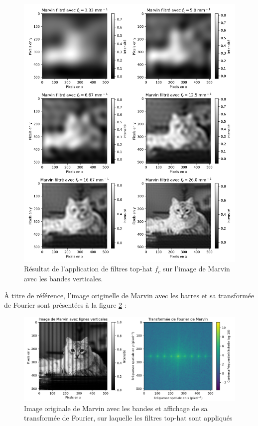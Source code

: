 \documentclass[11pt,letterpaper]{article}
\begin{document}
\begin{figure}[H]
  \centering
  \includegraphics[scale=0.7]{marvin_post_filter_bars.png}
  \caption{Résultat de l'application de filtres top-hat $f_c$ sur l'image de Marvin avec les bandes verticales.}
  \label{cats}
\end{figure}

À titre de référence, l'image originelle de Marvin avec les barres et sa transformée de Fourier sont présentées à la
figure \ref{cat} :

\begin{figure}[H]
  \centering
  \includegraphics[scale=0.65]{marvin_bars.png}
  \caption{Image originale de Marvin avec les bandes et affichage de sa transformée de Fourier, sur laquelle les filtres
  top-hat sont appliqués}
  \label{cat}
\end{figure}
\end{document}
